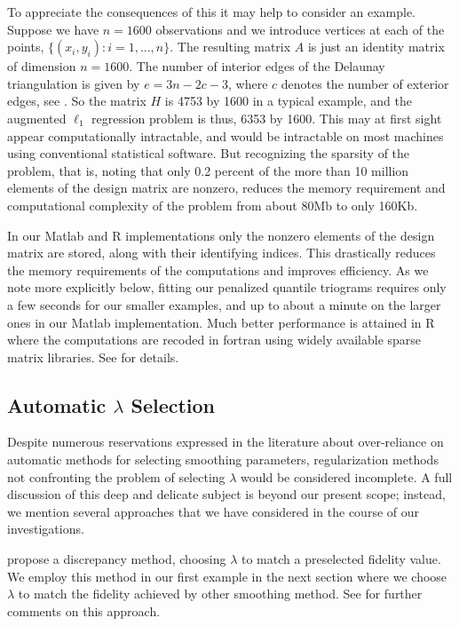 To appreciate the consequences of this it may help to consider an example.
Suppose we have $n=1600$ observations and we introduce vertices 
at each of the points, $\{ (x_i , y_i ): i = 1, ... , n\}$. 
The resulting matrix $A$ is just an identity matrix of dimension $n=1600$. 
The
number of interior edges of the Delaunay triangulation is given by
$e = 3 n - 2 c - 3$,
where $c$ denotes the number of exterior edges,  see .
So the matrix $H$ is 4753 by 1600 in a typical example, and the augmented 
$\ell_1$ regression
problem is thus, 6353 by 1600.  This may at first sight
appear computationally intractable,
and would be intractable on most machines using conventional statistical
software. But recognizing the sparsity of the problem, that is, noting
that only 0.2 percent of the more than 10 million
elements of the design matrix are nonzero, reduces the memory
requirement  and computational complexity of the problem from about 80Mb
to only 160Kb.

In our Matlab and R implementations only
the nonzero elements of the design matrix are stored, along
with their identifying indices. This drastically reduces the memory
requirements of the computations and improves efficiency. As we note
more explicitly below, fitting our penalized quantile triograms
requires only a few seconds for our smaller examples, and up to about
a minute on the larger ones in our Matlab implementation. Much better
performance is attained in R where the computations are recoded in fortran
using widely available sparse matrix libraries.  See 
for details.

\subsection{Automatic $\lambda$ Selection}

Despite numerous reservations expressed in the literature about
over-reliance on automatic methods for selecting smoothing parameters,
regularization methods not confronting the problem of
selecting $\lambda$ would be considered incomplete.  A
full discussion of this deep and delicate subject is beyond 
our present scope;  instead, we mention several approaches that
we have considered in the course of our investigations. 

 propose a discrepancy method, 
choosing $\lambda$ to match a preselected
fidelity value.  We employ this method in our first example in the 
next section where we choose  
$\lambda$ to match the fidelity achieved by  other smoothing method. 
See  for further comments on this approach.   

